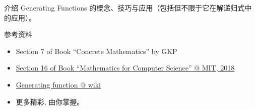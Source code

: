 \documentclass[a4paper, justified]{tufte-handout}
\begin{document}
\begin{ot}
  介绍 Generating Functions 的概念、技巧与应用（包括但不限于它在解递归式中的应用）。

  \noindent 参考资料
  \begin{itemize}
    \item Section 7 of Book ``Concrete Mathematics'' by GKP~\cite{Book:GKP}
    \item \href{https://courses.csail.mit.edu/6.042/spring18/mcs.pdf}{Section 16 of Book ``Mathematics for Computer Science'' @ MIT, 2018}
    \item \href{https://en.wikipedia.org/wiki/Generating\_function}{Generating function @ wiki}
    \item 更多精彩, 由你掌握。
  \end{itemize}
\end{ot}




\beginfb



\end{document}
